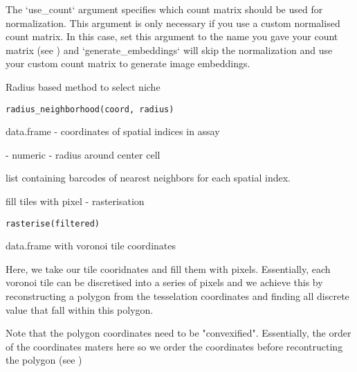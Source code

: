 \documentclass[a4paper]{book}
\begin{document}
%
\begin{Details}
The `use\_count` argument specifies which count matrix should be used
for normalization. This argument is only necessary if you use a custom
normalised count matrix. In this case, set this argument to the name
you gave your count matrix (see ) and
`generate\_embeddings` will skip the normalization and use your custom
count matrix to generate image embeddings.
\end{Details}
%
\begin{Description}
Radius based method to select niche
\end{Description}
%
\begin{Usage}
\begin{verbatim}
radius_neighborhood(coord, radius)
\end{verbatim}
\end{Usage}
%
\begin{Arguments}
\begin{ldescription}
\item[\code{coord}] data.frame - coordinates of spatial indices in assay

\item[\code{radius}] - numeric - radius around center cell
\end{ldescription}
\end{Arguments}
%
\begin{Value}
list containing barcodes of nearest neighbors for each 
spatial index.
\end{Value}
%
\begin{Description}
fill tiles with pixel - rasterisation
\end{Description}
%
\begin{Usage}
\begin{verbatim}
rasterise(filtered)
\end{verbatim}
\end{Usage}
%
\begin{Arguments}
\begin{ldescription}
\item[\code{filtered}] data.frame with voronoi tile coordinates
\end{ldescription}
\end{Arguments}
%
\begin{Details}
Here, we take our tile cooridnates and fill them 
with pixels. Essentially, each voronoi tile can be discretised 
into a series of pixels and we achieve this by reconstructing a 
polygon from the tesselation coordinates and finding all discrete 
value that fall within this polygon. 

Note that the polygon coordinates need to be "convexified". 
Essentially, the order of the coordinates maters here so we
order the coordinates before recontructing the polygon (see
)
\end{Details}
\end{document}
